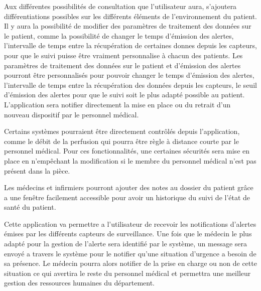 Aux différentes possibilités de consultation que l’utilisateur aura, s’ajoutera différentiations possibles sur les différents éléments de l’environnement du patient. Il y aura la possibilité de modifier des paramètres de traitement des données sur le patient, comme la possibilité de changer le temps d’émission des alertes, l’intervalle de temps entre la récupération de certaines donnes depuis les capteurs, pour que le suivi puisse être vraiment personnalise à chacun des patients. Les paramètres de traitement des données sur le patient et d’émission des alertes pourront être personnalisés pour pouvoir changer le temps d’émission des alertes, l’intervalle de temps entre la récupération des données depuis les capteurs, le seuil d’émission des alertes pour que le suivi soit le plus adapté possible au patient. L’application sera notifier directement la mise en place ou du retrait d’un nouveau dispositif par le personnel médical. 

Certains systèmes pourraient être directement contrôlés depuis l’application, comme le débit de la perfusion qui pourra être règle à distance courte par le personnel médical. Pour ces fonctionnalités, une certaines sécurités sera mise en place en n’empêchant la modification si le membre du personnel médical n’est pas présent dans la pièce.

Les médecins et infirmiers pourront ajouter des notes au dossier du patient grâce a une fenêtre facilement accessible pour avoir un historique du suivi de l’état de santé du patient.

Cette application va permettre a l’utilisateur de recevoir les notifications d’alertes émises par les différents capteurs de surveillance. Une fois que le médecin le plus adapté pour la gestion de l’alerte sera identifié par le système, un message sera envoyé a travers le système pour le notifier  qu’une situation d’urgence a besoin de sa présence. Le médecin pourra alors notifier de la prise en charge ou non de cette situation ce qui avertira le reste du personnel médical et permettra une meilleur gestion des ressources humaines du département.
